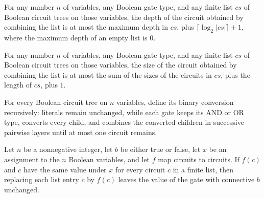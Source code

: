 \begin{theorem}
\label{BoolCircuit.combine_depth}
\leanok
{}
For any number $n$ of variables, any Boolean gate type, and any finite list $cs$ of
Boolean circuit trees on those variables, the depth of the circuit obtained by combining
the list is at most the maximum depth in $cs$, plus $\lceil\log_2 |cs|\rceil+1$, where
the maximum depth of an empty list is $0$.
\end{theorem}

\begin{theorem}
\label{BoolCircuit.combine_size}
\leanok
{}
For any number $n$ of variables, any Boolean gate type, and any finite list $cs$ of
Boolean circuit trees on those variables, the size of the circuit obtained by combining
the list is at most the sum of the sizes of the circuits in $cs$, plus the length of
$cs$, plus $1$.
\end{theorem}

\begin{definition}
\label{BoolCircuit.TreeCircuit.toBinary}
\leanok
{}
For every Boolean circuit tree on $n$ variables, define its binary conversion
recursively: literals remain unchanged, while each gate keeps its AND or OR type,
converts every child, and combines the converted children in successive pairwise layers
until at most one circuit remains.
\end{definition}

\begin{theorem}
\label{BoolCircuit.eval_node_map}
\leanok
{}
Let $n$ be a nonnegative integer, let $b$ be either true or false, let $x$ be an
assignment to the $n$ Boolean variables, and let $f$ map circuits to circuits. If $f(c)$
and $c$ have the same value under $x$ for every circuit $c$ in a finite list, then
replacing each list entry $c$ by $f(c)$ leaves the value of the gate with connective $b$
unchanged.
\end{theorem}

